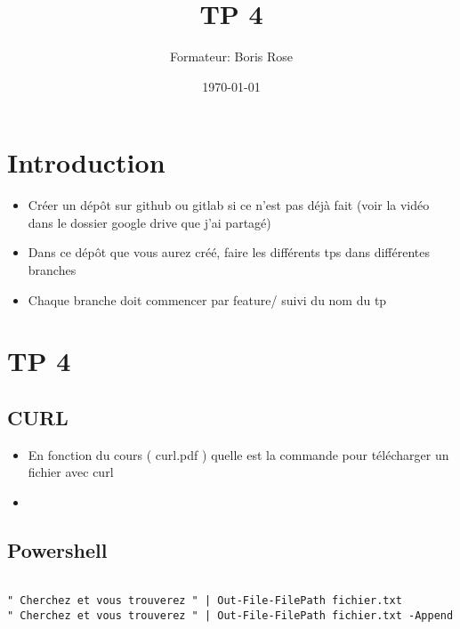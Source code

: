 \documentclass[12pt, letterpaper]{article}
\title{TP 4}
\author{Formateur: Boris Rose}
\date{\today}
\begin{document}
\maketitle

\section*{Introduction}

\begin{tcolorbox}[colback=brown!5,colframe=brown!60!black,title=Consignes]

\begin{itemize}
    \item Créer un dépôt sur github ou gitlab si ce n'est pas déjà fait (voir la vidéo dans le dossier google drive que j'ai partagé)
    \item Dans ce dépôt que vous aurez créé, faire les différents tps dans différentes branches
    \item Chaque branche doit commencer par feature/ suivi du nom du tp 
\end{itemize}


\end{tcolorbox}


\section*{TP 4}


\subsection*{CURL}

\begin{itemize}
    \item En fonction du cours ( curl.pdf ) quelle est la commande pour télécharger un fichier avec curl 
    \item 
\end{itemize}


\subsection*{Powershell}

\begin{verbatim}

" Cherchez et vous trouverez " | Out-File-FilePath fichier.txt
" Cherchez et vous trouverez " | Out-File-FilePath fichier.txt -Append
    
\end{verbatim}
\end{document}
